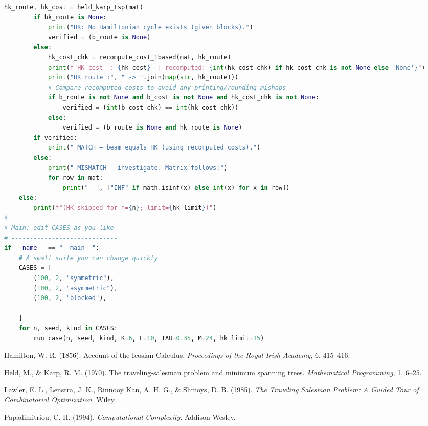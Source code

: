 \documentclass[sn-mathphys]{article}
\theoremstyle{thmstyleone}%
\theoremstyle{thmstyletwo}%
\theoremstyle{thmstylethree}%
\begin{document}
\begin{appendices}
\begin{lstlisting}[language=Python]
        hk_route, hk_cost = held_karp_tsp(mat)
        if hk_route is None:
            print("HK: No Hamiltonian cycle exists (given blocks).")
            verified = (b_route is None)
        else:
            hk_cost_chk = recompute_cost_1based(mat, hk_route)
            print(f"HK cost  : {hk_cost}  | recomputed: {int(hk_cost_chk) if hk_cost_chk is not None else 'None'}")
            print("HK route :", " -> ".join(map(str, hk_route)))
            # Compare recomputed costs to avoid any printing/rounding mishaps
            if b_route is not None and b_cost is not None and hk_cost_chk is not None:
                verified = (int(b_cost_chk) == int(hk_cost_chk))
            else:
                verified = (b_route is None and hk_route is None)
        if verified:
            print(" MATCH — beam equals HK (using recomputed costs).")
        else:
            print(" MISMATCH — investigate. Matrix follows:")
            for row in mat:
                print("  ", ["INF" if math.isinf(x) else int(x) for x in row])
    else:
        print(f"(HK skipped for n={n}; limit={hk_limit})")
# -----------------------------
# Main: edit CASES as you like
# -----------------------------
if __name__ == "__main__":
    # A small suite you can change quickly
    CASES = [
        (100, 2, "symmetric"),
        (100, 2, "asymmetric"),
        (100, 2, "blocked"),
    
    ]
    for n, seed, kind in CASES:
        run_case(n, seed, kind, K=6, L=10, TAU=0.35, M=24, hk_limit=15)

\end{lstlisting}
\end{appendices}

\begin{thebibliography}{99}

Hamilton, W. R. (1856). Account of the Icosian Calculus. \textit{Proceedings of the Royal Irish Academy}, 6, 415–416.

Held, M., \& Karp, R. M. (1970). The traveling-salesman problem and minimum spanning trees. \textit{Mathematical Programming}, 1, 6–25.

Lawler, E. L., Lenstra, J. K., Rinnooy Kan, A. H. G., \& Shmoys, D. B. (1985). \textit{The Traveling Salesman Problem: A Guided Tour of Combinatorial Optimization}. Wiley.

Papadimitriou, C. H. (1994). \textit{Computational Complexity}. Addison-Wesley.

\end{thebibliography}
\end{document}
